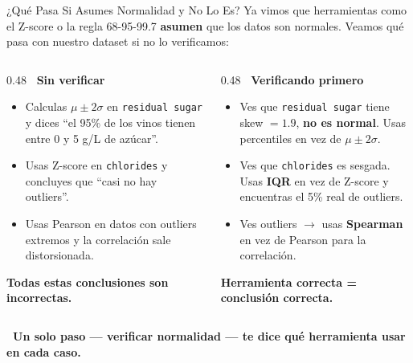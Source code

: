 \documentclass[aspectratio=169, 11pt]{beamer}
\begin{document}
\begin{frame}[shrink=5]{¿Qué Pasa Si Asumes Normalidad y No Lo Es?}
  \vspace{-4pt}
  {\footnotesize
    Ya vimos que herramientas como el Z-score o la regla 68-95-99.7 \textbf{asumen}
    que los datos son normales. Veamos qué pasa con nuestro dataset si no lo verificamos:}

  \vspace{6pt}
  \begin{columns}[T]
    \begin{column}{0.48\textwidth}
      {\footnotesize\bfseries\color{arcaRed} \faTimesCircle\ Sin verificar}
      \vspace{4pt}

      {\scriptsize
      \begin{itemize}\setlength{\itemsep}{5pt}
        \item Calculas $\mu \pm 2\sigma$ en \texttt{residual sugar}
          y dices ``el 95\% de los vinos tienen entre 0 y 5 g/L de azúcar''.
        \item Usas Z-score en \texttt{chlorides} y concluyes que
          ``casi no hay outliers''.
        \item Usas Pearson en datos con outliers extremos
          y la correlación sale distorsionada.
      \end{itemize}
      }

      \vspace{4pt}
      {\scriptsize\color{arcaRed}\bfseries
        Todas estas conclusiones son incorrectas.}
    \end{column}

    \begin{column}{0.48\textwidth}
      {\footnotesize\bfseries\color{codeGreen} \faCheckCircle\ Verificando primero}
      \vspace{4pt}

      {\scriptsize
      \begin{itemize}\setlength{\itemsep}{5pt}
        \item Ves que \texttt{residual sugar} tiene skew $= 1.9$,
          \textbf{no es normal}. Usas percentiles en vez de $\mu \pm 2\sigma$.
        \item Ves que \texttt{chlorides} es sesgada.
          Usas \textbf{IQR} en vez de Z-score y encuentras el 5\% real de outliers.
        \item Ves outliers $\to$ usas \textbf{Spearman}
          en vez de Pearson para la correlación.
      \end{itemize}
      }

      \vspace{4pt}
      {\scriptsize\color{codeGreen}\bfseries
        Herramienta correcta = conclusión correcta.}
    \end{column}
  \end{columns}

  \vspace{6pt}
  {\scriptsize\color{arcaDark}\bfseries
    \faArrowRight\ Un solo paso --- verificar normalidad --- te dice
    \textbf{qué herramienta usar} en cada caso.}
\end{frame}
\end{document}
